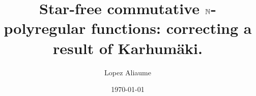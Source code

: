 \title{
    Star-free commutative $\mathbb{N}$-polyregular functions:
    correcting a result of Karhumäki.
}
\author{
    Lopez Aliaume
}
\date{\today}


\newcommand{\acknowledge}{
    I would like to thank Gaëtan Douéneau-Tabot
    for mentionning this problem, checking 
    my counter-example, and supporting me in publishing
    this paper.
}

\newcommand{\makeabstract}{
    \begin{abstract}
        Deciding whether a $\Rel$-rational series
        can be computed as a $\Nat$-rational series
        is an open problem that was solved by Karhumäki in the
        specific case of $\Rel$-rational series that are commutative
        and compute a polynomial.
        We propose a short counter-example to this
        previous result on commutative $\Nat$-rational series,
        and prove a corrected version of the theorem,
        working of tdd
        We then discuss how the syntactic criterion could
        pave the way towards a decision procedure when the commutativity
        of the $\Rel$-rational series
        is not assumed.

        \begin{itemize}
            \item Deciding $\Nat$ inside $\Rel$.
            \item Counter example.
            \item Characterization of $\Nat$-polyregular.
            \item Characterization of star free $\Nat$-polyregular.
        \end{itemize}
    \end{abstract}
}
